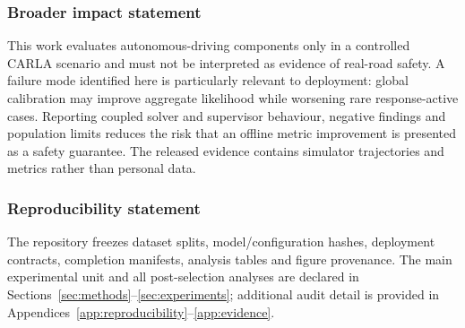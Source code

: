 \documentclass[10pt]{article}
\begin{document}









\subsubsection*{Broader impact statement}
This work evaluates autonomous-driving components only in a controlled CARLA
scenario and must not be interpreted as evidence of real-road safety. A
failure mode identified here is particularly relevant to deployment: global
calibration may improve aggregate likelihood while worsening rare
response-active cases. Reporting coupled solver and supervisor behaviour,
negative findings and population limits reduces the risk that an offline
metric improvement is presented as a safety guarantee. The released evidence
contains simulator trajectories and metrics rather than personal data.

\subsubsection*{Reproducibility statement}
The repository freezes dataset splits, model/configuration hashes, deployment
contracts, completion manifests, analysis tables and figure provenance. The
main experimental unit and all post-selection analyses are declared in
Sections~\ref{sec:methods}--\ref{sec:experiments}; additional audit detail is
provided in Appendices~\ref{app:reproducibility}--\ref{app:evidence}.




\appendix



\end{document}
